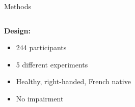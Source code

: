 \begin{frame}{Methods}

\fontsize{11pt}{16}\selectfont
\begin{columns}
\begin{column}{0.5\textwidth}
{\large\textbf{Design:}}
\vspace{0.2cm}
\begin{itemize}
    \item 244 participants
    \item 5 different experiments
    \item Healthy, right-handed, French native
    \item No impairment
\end{itemize}

\end{column}
\begin{column}{0.5\textwidth}
\end{column}
\end{columns}


\end{frame}